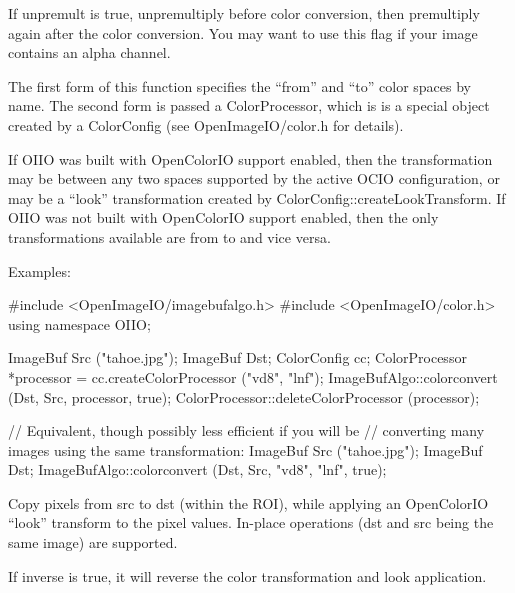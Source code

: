 If {\cf unpremult} is {\cf true}, unpremultiply before color conversion,
then premultiply again after the color conversion.  You may want to use
this flag if your image contains an alpha channel.

The first form of this function specifies the ``from''
and ``to'' color spaces by name.
The second form is passed a {\cf ColorProcessor},
which is is a special object created by a
{\cf ColorConfig} (see {\cf OpenImageIO/color.h} for details).

If OIIO was built with OpenColorIO support enabled, then the transformation
may be between any two spaces supported by the active OCIO configuration, or
may be a ``look'' transformation created by {\cf
ColorConfig::createLookTransform}.  If OIIO was not built with OpenColorIO
support enabled, then the only transformations available are from 
to  and vice versa.

\smallskip
\noindent Examples:
\begin{code}
    #include <OpenImageIO/imagebufalgo.h>
    #include <OpenImageIO/color.h>
    using namespace OIIO;

    ImageBuf Src ("tahoe.jpg");
    ImageBuf Dst;
    ColorConfig cc;
    ColorProcessor *processor = cc.createColorProcessor ("vd8", "lnf");
    ImageBufAlgo::colorconvert (Dst, Src, processor, true);
    ColorProcessor::deleteColorProcessor (processor);

    // Equivalent, though possibly less efficient if you will be
    // converting many images using the same transformation:
    ImageBuf Src ("tahoe.jpg");
    ImageBuf Dst;
    ImageBufAlgo::colorconvert (Dst, Src, "vd8", "lnf", true);
\end{code}
\apiend

 
Copy pixels from {\cf src} to {\cf dst} (within the ROI), while
applying an OpenColorIO ``look'' transform to the pixel values.
In-place operations ({\cf dst} and {\cf src} being the same image)
are supported.

If {\cf inverse} is {\cf true}, it will reverse the color transformation
and look application.

